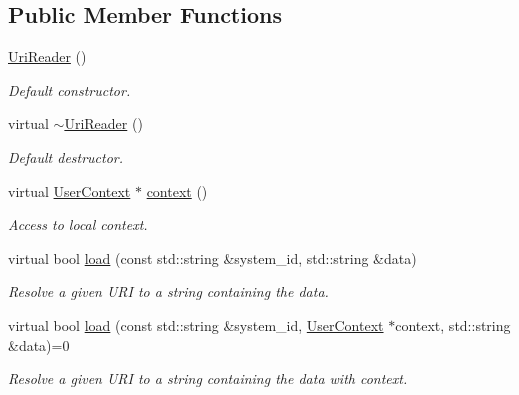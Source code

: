 \subsection*{Public Member Functions}
\begin{DoxyCompactItemize}
\item 
\hyperlink{class_d_d4hep_1_1_x_m_l_1_1_uri_reader_a9e7b119a191640572c3cdf2b8c3e3023}{UriReader} ()
\begin{DoxyCompactList}\small\item\em Default constructor. \item\end{DoxyCompactList}\item 
virtual \hyperlink{class_d_d4hep_1_1_x_m_l_1_1_uri_reader_af8a3cc8ac2e0a5c0f2ea45c3894a2582}{$\sim$UriReader} ()
\begin{DoxyCompactList}\small\item\em Default destructor. \item\end{DoxyCompactList}\item 
virtual \hyperlink{struct_d_d4hep_1_1_x_m_l_1_1_uri_reader_1_1_user_context}{UserContext} $\ast$ \hyperlink{class_d_d4hep_1_1_x_m_l_1_1_uri_reader_a9f8d06469b3e5bf1e69c72c4285dfcac}{context} ()
\begin{DoxyCompactList}\small\item\em Access to local context. \item\end{DoxyCompactList}\item 
virtual bool \hyperlink{class_d_d4hep_1_1_x_m_l_1_1_uri_reader_a4cb644360608b580a1aaa4ccb9a8c7fa}{load} (const std::string \&system\_\-id, std::string \&data)
\begin{DoxyCompactList}\small\item\em Resolve a given URI to a string containing the data. \item\end{DoxyCompactList}\item 
virtual bool \hyperlink{class_d_d4hep_1_1_x_m_l_1_1_uri_reader_a80a35ded7f30ba3b1954edb0e0493d6f}{load} (const std::string \&system\_\-id, \hyperlink{struct_d_d4hep_1_1_x_m_l_1_1_uri_reader_1_1_user_context}{UserContext} $\ast$context, std::string \&data)=0
\begin{DoxyCompactList}\small\item\em Resolve a given URI to a string containing the data with context. \item\end{DoxyCompactList}\item 

\end{DoxyCompactItemize}

